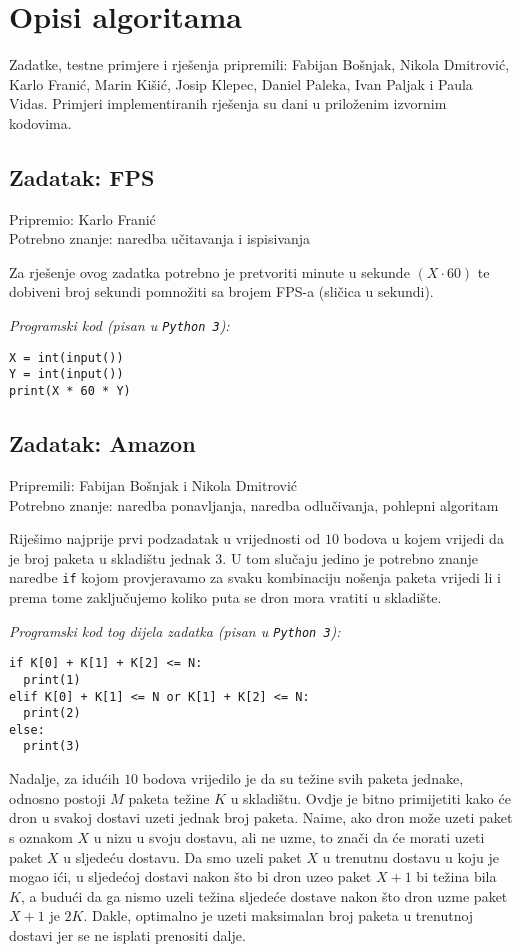 \documentclass[a4paper]{article}
\begin{document}
\section*{Opisi algoritama}
Zadatke, testne primjere i rješenja pripremili: Fabijan Bošnjak, Nikola
Dmitrović, Karlo Franić, Marin Kišić, Josip Klepec, Daniel Paleka, Ivan Paljak
i Paula Vidas.  Primjeri implementiranih rješenja su dani u priloženim izvornim
kodovima.

\subsection*{Zadatak: FPS}
\textsf{Pripremio: Karlo Franić}\\
\textsf{Potrebno znanje: naredba učitavanja i ispisivanja}

Za rješenje ovog zadatka potrebno je pretvoriti minute u sekunde $(X \cdot 60)$ te
dobiveni broj sekundi pomnožiti sa brojem FPS-a (sličica u sekundi).

\textit{Programski kod (pisan u \texttt{Python 3}):}

\vspace{-2ex}
\begin{verbatim}
X = int(input())
Y = int(input())
print(X * 60 * Y)
\end{verbatim}

\subsection*{Zadatak: Amazon}
\textsf{Pripremili: Fabijan Bošnjak i Nikola Dmitrović}\\
\textsf{Potrebno znanje: naredba ponavljanja, naredba odlučivanja, pohlepni algoritam}

Riješimo najprije prvi podzadatak u vrijednosti od $10$ bodova u kojem vrijedi
da je broj paketa u skladištu jednak $3$. U tom slučaju jedino je potrebno
znanje naredbe \texttt{if} kojom provjeravamo za svaku kombinaciju nošenja
paketa vrijedi li i prema tome zaključujemo koliko puta se dron mora vratiti u
skladište.

\textit{Programski kod tog dijela zadatka (pisan u \texttt{Python 3}):}

\vspace{-2ex}
\begin{verbatim}
if K[0] + K[1] + K[2] <= N:
  print(1)
elif K[0] + K[1] <= N or K[1] + K[2] <= N:
  print(2)
else:
  print(3)
\end{verbatim}

Nadalje, za idućih $10$ bodova vrijedilo je da su težine svih paketa jednake,
odnosno postoji $M$ paketa težine $K$ u skladištu. Ovdje je bitno primijetiti
kako će dron u svakoj dostavi uzeti jednak broj paketa. Naime, ako dron može
uzeti paket s oznakom $X$ u nizu u svoju dostavu, ali ne uzme, to znači da će
morati uzeti paket $X$ u sljedeću dostavu. Da smo uzeli paket $X$ u trenutnu
dostavu u koju je mogao ići, u sljedećoj dostavi nakon što bi dron uzeo paket
$X+1$ bi težina bila $K$, a budući da ga nismo uzeli težina sljedeće dostave
nakon što dron uzme paket $X+1$ je $2K$. Dakle, optimalno je uzeti maksimalan
broj paketa u trenutnoj dostavi jer se ne isplati prenositi dalje.
\end{document}
